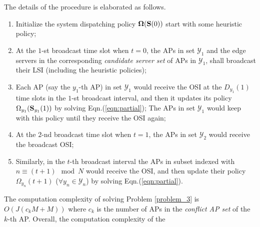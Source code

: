 The details of the procedure is elaborated as follows.
\begin{enumerate}
    \item Initialize the system dispatching policy $\boldsymbol{\Omega}(\mathbf{S}(0))$ start with some heuristic policy;
    \item At the $1$-st broadcast time slot when $t=0$, the APs in set $\mathcal{Y}_{1}$ and the edge servers in the corresponding \emph{candidate server set} of APs in $\mathcal{Y}_{1}$, shall broadcast their LSI (including the heuristic policies);
    \item Each AP (say the $y_1$-th AP) in set $\mathcal{Y}_{1}$ would receive the OSI at the $D_{y_1}(1)$ time slots in the $1$-st broadcast interval, and then it updates its policy $\Omega_{y_1}(\mathbf{S}_{y_1}(1))$ by solving Eqn.(\ref{eqn:partial}); The APs in set $\mathcal{Y}_{1}$ would keep with this policy until they receive the OSI again;
    \item At the $2$-nd broadcast time slot when $t=1$, the APs in set $\mathcal{Y}_{2}$ would receive the  broadcast OSI;
    \item Similarly, in the $t$-th broadcast interval the APs in subset indexed with $n \equiv (t + 1)\mod{N}$ would receive the OSI, and then update their policy $\Omega_{y_n}(t+1)$ ($\forall y_n\in\mathcal{Y}_{n}$) by solving Eqn.(\ref{eqn:partial}).
\end{enumerate}

\begin{lemma}
    The computation complexity of solving Problem \ref{problem_3} is $O(J(c_kM+M))$ where $c_k$ is the number of APs in the \emph{conflict AP set} of the $k$-th AP.
    Overall, the computation complexity of the 
\end{lemma}

    
